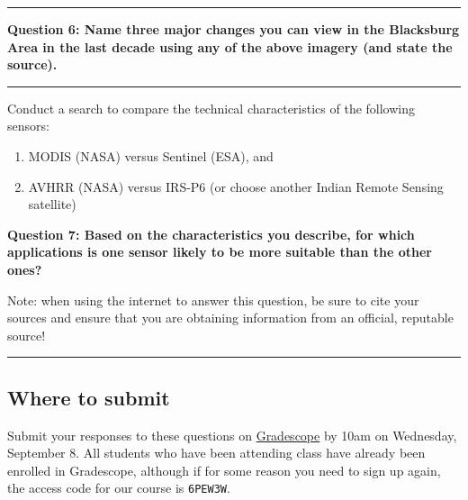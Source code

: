 \documentclass[
]{article}
\providecommand{\tightlist}{%
  \setlength{\itemsep}{0pt}\setlength{\parskip}{0pt}}
\begin{document}
\begin{center}\rule{0.5\linewidth}{0.5pt}\end{center}

\textbf{Question 6: Name three major changes you can view in the Blacksburg Area in the last decade using any of the above imagery (and state the source).}

\begin{center}\rule{0.5\linewidth}{0.5pt}\end{center}

Conduct a search to compare the technical characteristics of the following sensors:

\begin{enumerate}
\def\labelenumi{(\roman{enumi})}
\tightlist
\item
  MODIS (NASA) versus Sentinel (ESA), and
\item
  AVHRR (NASA) versus IRS-P6 (or choose another Indian Remote Sensing satellite)
\end{enumerate}

\textbf{Question 7: Based on the characteristics you describe, for which applications is one sensor likely to be more suitable than the other ones? }

Note: when using the internet to answer this question, be sure to cite your sources and ensure that you are obtaining information from an official, reputable source!

\begin{center}\rule{0.5\linewidth}{0.5pt}\end{center}

\hypertarget{where-to-submit}{%
\subsection*{Where to submit}\label{where-to-submit}}

Submit your responses to these questions on \href{https://www.gradescope.com/courses/293173/assignments/1446622/submissions}{Gradescope} by 10am on Wednesday, September 8. All students who have been attending class have already been enrolled in Gradescope, although if for some reason you need to sign up again, the access code for our course is \texttt{6PEW3W}.
\end{document}

